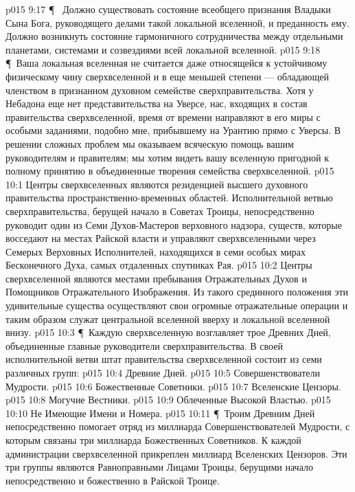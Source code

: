 \vs p015 9:17 \P\ \bibnobreakspace {} Должно существовать состояние всеобщего признания Владыки Сына Бога, руководящего делами такой локальной вселенной, и преданность ему. Должно возникнуть состояние гармоничного сотрудничества между отдельными планетами, системами и созвездиями всей локальной вселенной.
\vs p015 9:18 \P\ Ваша локальная вселенная не считается даже относящейся к устойчивому физическому чину сверхвселенной и в еще меньшей степени --- обладающей членством в признанном духовном семействе сверхправительства. Хотя у Небадона еще нет представительства на Уверсе, нас, входящих в состав правительства сверхвселенной, время от времени направляют в его миры с особыми заданиями, подобно мне, прибывшему на Урантию прямо с Уверсы. В решении сложных проблем мы оказываем всяческую помощь вашим руководителям и правителям; мы хотим видеть вашу вселенную пригодной к полному принятию в объединенные творения семейства сверхвселенной.
\vs p015 10:1 Центры сверхвселенных являются резиденцией высшего духовного правительства пространственно\hyp{}временных областей. Исполнительной ветвью сверхправительства, берущей начало в Советах Троицы, непосредственно руководит один из Семи Духов\hyp{}Мастеров верховного надзора, существ, которые восседают на местах Райской власти и управляют сверхвселенными через Семерых Верховных Исполнителей, находящихся в семи особых мирах Бесконечного Духа, самых отдаленных спутниках Рая.
\vs p015 10:2 Центры сверхвселенной являются местами пребывания Отражательных Духов и Помощников Отражательного Изображения. Из такого срединного положения эти удивительные существа осуществляют свои огромные отражательные операции и таким образом служат центральной вселенной вверху и локальной вселенной внизу.
\vs p015 10:3 \P\ Каждую сверхвселенную возглавляет трое Древних Дней, объединенные главные руководители сверхправительства. В своей исполнительной ветви штат правительства сверхвселенной состоит из семи различных групп:
\vs p015 10:4 \bibnobreakspace Древние Дней.
\vs p015 10:5 \bibnobreakspace Совершенствователи Мудрости.
\vs p015 10:6 \bibnobreakspace Божественные Советники.
\vs p015 10:7 \bibnobreakspace Вселенские Цензоры.
\vs p015 10:8 \bibnobreakspace Могучие Вестники.
\vs p015 10:9 \bibnobreakspace Облеченные Высокой Властью.
\vs p015 10:10 \bibnobreakspace Не Имеющие Имени и Номера.
\vs p015 10:11 \P\ Троим Древним Дней непосредственно помогает отряд из миллиарда Совершенствователей Мудрости, с которым связаны три миллиарда Божественных Советников. К каждой администрации сверхвселенной прикреплен миллиард Вселенских Цензоров. Эти три группы являются Равноправными Лицами Троицы, берущими начало непосредственно и божественно в Райской Троице.
